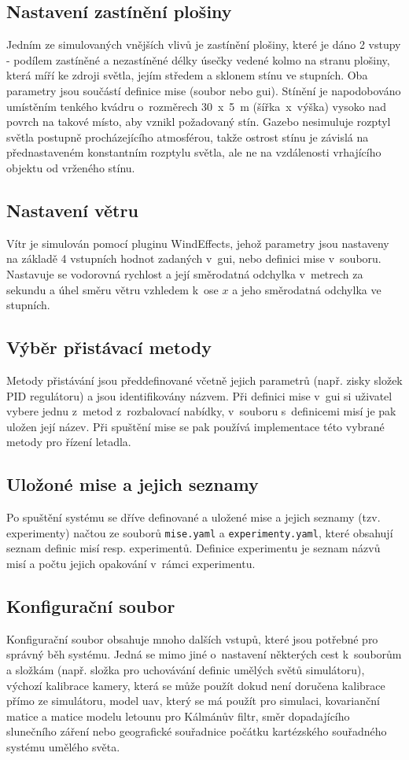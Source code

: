     \subsection{Nastavení zastínění plošiny}
      Jedním ze simulovaných vnějších vlivů je zastínění plošiny, které je dáno 2 vstupy - podílem zastíněné a nezastíněné délky úsečky vedené kolmo na stranu plošiny, která míří ke zdroji světla, jejím středem a sklonem stínu ve stupních. Oba parametry jsou součástí definice mise (soubor nebo \acrshort{gui}). Stínění je napodobováno umístěním tenkého kvádru o~rozměrech 30~x~5~m (šířka~x~výška) vysoko nad povrch na takové místo, aby vznikl požadovaný stín. Gazebo nesimuluje rozptyl světla postupně procházejícího atmosférou, takže ostrost stínu je závislá na přednastaveném konstantním rozptylu světla, ale ne na vzdálenosti vrhajícího objektu od vrženého stínu.
    \subsection{Nastavení větru}
      Vítr je simulován pomocí pluginu WindEffects, jehož parametry jsou nastaveny na základě 4 vstupních hodnot zadaných v~\acrshort{gui}, nebo definici mise v~souboru. Nastavuje se vodorovná rychlost a její směrodatná odchylka v~metrech za sekundu a úhel směru větru vzhledem k~ose $x$ a jeho směrodatná odchylka ve stupních.
    \subsection{Výběr přistávací metody}
      Metody přistávání jsou předdefinované včetně jejich parametrů (např. zisky složek PID regulátoru) a jsou identifikovány názvem. Při definici mise v~\acrshort{gui} si uživatel vybere jednu z~metod z~rozbalovací nabídky, v~souboru s~definicemi misí je pak uložen její název. Při spuštění mise se pak používá implementace této vybrané metody pro řízení letadla.
    \subsection{Uložoné mise a jejich seznamy} \label{sec:saved}
      Po spuštění systému se dříve definované a uložené mise a jejich seznamy (tzv. experimenty) načtou ze souborů \texttt{mise.yaml} a \texttt{experimenty.yaml}, které obsahují seznam definic misí resp. experimentů. Definice experimentu je seznam názvů misí a počtu jejich opakování v~rámci experimentu.
    \subsection{Konfigurační soubor}
      Konfigurační soubor obsahuje mnoho dalších vstupů, které jsou potřebné pro správný běh systému. Jedná se mimo jiné o~nastavení některých cest k~souborům a složkám (např. složka pro uchovávání definic umělých světů simulátoru), výchozí kalibrace kamery, která se může použít dokud není doručena kalibrace přímo ze simulátoru, model \acrshort{uav}, který se má použít pro simulaci, kovarianční matice a matice modelu letounu pro Kálmánův filtr, směr dopadajícího slunečního záření nebo geografické souřadnice počátku kartézského souřadného systému umělého světa.
